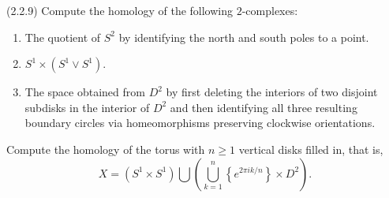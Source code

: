\documentclass[12pt]{article}
\begin{document}



\begin{problem}{1}(2.2.9) Compute the homology of the following $2$-complexes:
\begin{enumerate}
	\item The quotient of $S^2$ by identifying the north and south poles to a point.
	\item $S^1 \times (S^1 \vee S^1)$.
	\item The space obtained from $D^2$ by first deleting the interiors of two disjoint subdisks in the interior of $D^2$ and then identifying all three resulting boundary circles via homeomorphisms preserving clockwise orientations.
\end{enumerate}
\end{problem}

\begin{solution}
\end{solution}

\newpage

\begin{problem}{2}
    Compute the homology of the torus with $n \geq 1$ vertical disks filled in, that is, 
\[ X = (S^1 \times S^1) \bigcup \left( \bigcup_{k=1}^{n} \left\{ e^{2 \pi i k/n}\right\}  \times D^2 \right). \]
\end{problem}

\begin{solution}
\end{solution}

\newpage
\end{document}
